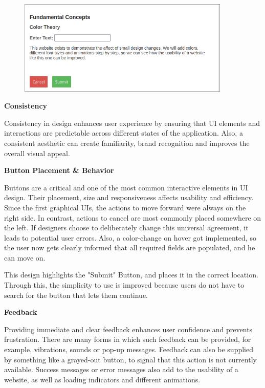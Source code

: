     \begin{figure} [H]
        \center
        \includegraphics [width=0.9\textwidth] {images/paul/usabilityExamples/ColorTheoryExample.png}
        \caption{}
    \end{figure}

\blankLine

\textbf{Consistency}

Consistency in design enhances user experience by ensuring that UI elements and interactions are predictable across different states of the application. Also, a consistent aesthetic can create familiarity, brand recognition and improves the overall visual appeal.

\blankLine

\textbf{Button Placement \& Behavior}

Buttons are a critical and one of the most common interactive elements in UI design. Their placement, size and responsiveness affects usability and efficiency. Since the first graphical UIs, the actions to move forward were always on the right side. In contrast, actions to cancel are most commonly placed somewhere on the left. If designers choose to deliberately change this universal agreement, it leads to potential user errors. Also, a color-change on hover got implemented, so the user now gets clearly informed that all required fields are populated, and he can move on. 

\blankLine

    This design highlights the "Submit" Button, and places it in the correct location. Through this, the simplicity to use is improved because users do not have to search for the button that lets them continue. 
    

\blankLine

\textbf{Feedback}

Providing immediate and clear feedback enhances user confidence and prevents frustration. There are many forms in which such feedback can be provided, for example, vibrations, sounds or pop-up messages. Feedback can also be supplied by something like a grayed-out button, to signal that this action is not currently available. Success messages or error messages also add to the usability of a website, as well as loading indicators and different animations.


